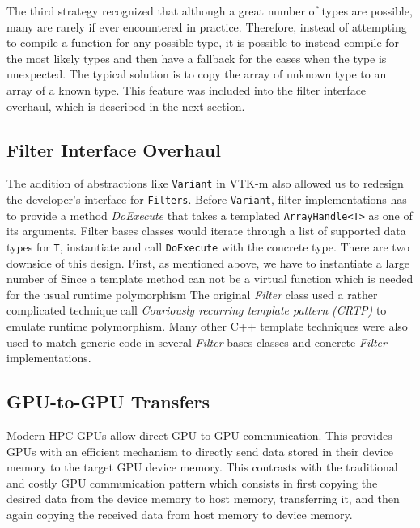 The third strategy recognized that although a great number of types are possible, many are rarely if ever encountered in practice.
Therefore, instead of attempting to compile a function for any possible type, it is possible to instead compile for the most likely types and then have a fallback for the cases when the type is unexpected.
The typical solution is to copy the array of unknown type to an array of a known type.
This feature was included into the filter interface overhaul, which is described in the next section.

\subsection{Filter Interface Overhaul}


The addition of abstractions like \texttt{Variant} in VTK-m also allowed us to redesign the developer's interface for \texttt{Filters}. Before \texttt{Variant}, filter implementations has to provide a method \textit{DoExecute} that takes a templated \texttt{ArrayHandle<T>} as one of its arguments. Filter bases classes would iterate through a list of supported data types for \texttt{T}, instantiate and call \texttt{DoExecute} with the concrete type. There are two downside of this design. First, as mentioned above, we have to instantiate a large number of Since a template method can not be a virtual function which is needed for the usual runtime polymorphism The original \textit{Filter} class used a rather complicated technique call \emph{Couriously recurring template pattern (CRTP)} to emulate runtime polymorphism. Many other C++ template techniques were also used to match generic code in several \textit{Filter} bases classes and concrete \textit{Filter} implementations.

\subsection{GPU-to-GPU Transfers}

Modern HPC GPUs allow direct GPU-to-GPU communication. This provides GPUs with an efficient mechanism to directly send data stored in their device memory to the target GPU device memory. This contrasts with the traditional and costly GPU communication pattern which consists in first copying the desired data from the device memory to host memory, transferring it, and then again copying the received data from host memory to device memory.

